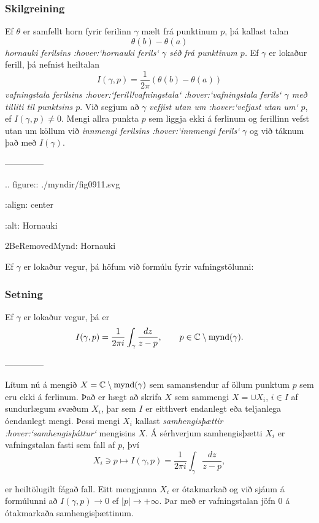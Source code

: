 \subsubsection{Skilgreining}
Ef $\theta$ er samfellt horn fyrir ferilinn $\gamma$ mælt frá
punktinum $p$, þá kallast talan
$$ \theta(b)-\theta(a) $$
{\it hornauki ferilsins :hover:`hornauki ferils` $\gamma$ séð frá
punktinum $p$.} Ef $\gamma$ er lokaður ferill, þá nefnist heiltalan
$$ I(\gamma,p)=\dfrac 1{2\pi}(\theta(b)-\theta(a)) $$
{\it vafningstala
ferilsins :hover:`ferill!vafningstala` :hover:`vafningstala ferils`
$\gamma$ með tilliti til punktsins $p$}.
Við segjum að $\gamma$ {\it vefjist utan um :hover:`vefjast utan um`} $p$, ef
$I(\gamma,p)\neq 0$.  Mengi allra punkta $p$ sem liggja ekki á
ferlinum og ferillinn vefst utan um köllum við {\it innmengi
ferilsins :hover:`innmengi ferils`} $\gamma$ og við táknum það með
$I(\gamma)$.


--------------



.. figure:: ./myndir/fig0911.svg

    :align: center

    :alt: Hornauki 

    2BeRemovedMynd: Hornauki 


\noindent
Ef $\gamma$ er lokaður vegur, þá höfum við formúlu fyrir
vafningstölunni:


\subsubsection{Setning}  Ef $\gamma$ er lokaður vegur, þá er
 $$I(\gamma,p)=\dfrac 1{2\pi i}\int_\gamma \dfrac{dz}{z-p}, 
\qquad p\in {\mathbb C}\setminus {{\operatorname{mynd}(\gamma)}}.
 $$


--------------



 Lítum nú á mengið $X={\mathbb C}\setminus {{\operatorname{mynd}(\gamma)}}$ sem samanstendur af
öllum punktum $p$ sem eru ekki á ferlinum.    Það er hægt að skrifa
$X$ sem sammengi $X=\cup X_i$, $i\in I$ af sundurlægum svæðum $X_i$,
þar sem $I$ er eitthvert endanlegt eða teljanlega óendanlegt mengi.
Þessi mengi $X_i$ kallast {\it samhengisþættir :hover:`samhengisþáttur`}
mengisins $X$. Á sérhverjum samhengisþætti  $X_i$ er vafningstalan
fasti sem fall af $p$, því
$$
X_i\ni p\mapsto I(\gamma,p) = \dfrac 1{2\pi i}\int_\gamma \dfrac
{dz}{z-p}, 
$$

 
\noindent
er heiltölugilt fágað fall.  Eitt mengjanna $X_i$ er ótakmarkað og
við sjáum á formúlunni að $I(\gamma,p)\to 0$ ef $|p|\to +\infty$.
Þar með er vafningstalan jöfn $0$ á ótakmarkaða samhengisþættinum.


